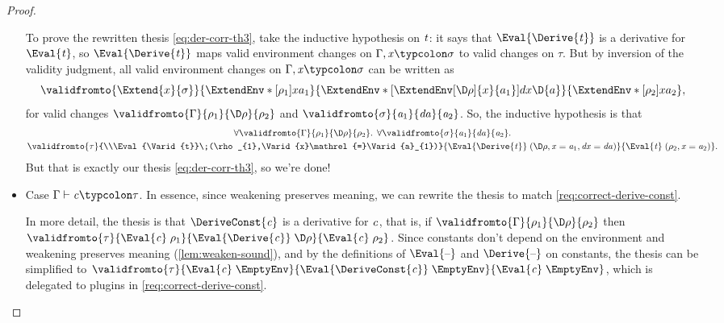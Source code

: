 \begin{proof}
\begin{itemize}
    To prove the rewritten thesis \cref{eq:der-corr-th3}, take the inductive hypothesis on \ensuremath{\Varid{t}}: it says
    that \ensuremath{\Eval{\Derive{\Varid{t}}}} is a derivative for \ensuremath{\Eval{\Varid{t}}}, so \ensuremath{\Eval{\Derive{\Varid{t}}}} maps
    valid environment changes on \ensuremath{\Gamma,\Varid{x}\typcolon\sigma} to valid changes on \ensuremath{\tau}.
    But by inversion of the validity judgment,
    all valid environment changes on \ensuremath{\Gamma,\Varid{x}\typcolon\sigma} can be written as
    \[
      \validfromto{\Extend{x}{\sigma}}
      {\ExtendEnv*[\rho_1]{x}{a_1}}
      {\ExtendEnv*[\ExtendEnv[\D\rho]{x}{a_1}]{dx}{\D{a}}}
      {\ExtendEnv*[\rho_2]{x}{a_2}},\]
    for valid changes \ensuremath{\validfromto{\Gamma}{\rho_{1}}{\D\rho}{\rho_{2}}} and \ensuremath{\validfromto{\sigma}{\Varid{a}_{1}}{\Varid{da}}{\Varid{a}_{2}}}.
    So, the inductive hypothesis is that
    \begin{multline}
      \ensuremath{\forall \validfromto{\Gamma}{\rho_{1}}{\D\rho}{\rho_{2}}\hsforall \hsdot{\circ }{\mathpunct{.}}\;\forall \validfromto{\sigma}{\Varid{a}_{1}}{\Varid{da}}{\Varid{a}_{2}}\hsforall \hsdot{\circ }{\mathpunct{.}}\\\validfromto{\tau}{\\\Eval{\Varid{t}}\;(\rho_{1},\Varid{x}\mathrel{=}\Varid{a}_{1})}{\Eval{\Derive{\Varid{t}}}\;(\D\rho,\Varid{x}\mathrel{=}\Varid{a}_{1},\Varid{dx}\mathrel{=}\Varid{da})}{\Eval{\Varid{t}}\;(\rho_{2},\Varid{x}\mathrel{=}\Varid{a}_{2})}}.
    \end{multline}
    But that is exactly our thesis \cref{eq:der-corr-th3}, so we're done!
  \item Case \ensuremath{\Gamma\vdash\Varid{c}\typcolon\tau}. In essence, since weakening
    preserves meaning, we can rewrite the thesis to match
    \cref{req:correct-derive-const}.

    In more detail, the thesis is that \ensuremath{\DeriveConst{\Varid{c}}} is a
    derivative for \ensuremath{\Varid{c}}, that is, if \ensuremath{\validfromto{\Gamma}{\rho_{1}}{\D\rho}{\rho_{2}}} then \ensuremath{\validfromto{\tau}{\Eval{\Varid{c}}\;\rho_{1}}{\Eval{\Derive{\Varid{c}}}\;\D\rho}{\Eval{\Varid{c}}\;\rho_{2}}}. Since constants don't depend on the
    environment and weakening preserves meaning
    (\cref{lem:weaken-sound}), and by the definitions of
    \ensuremath{\Eval{\text{\textendash}}} and \ensuremath{\Derive{\text{\textendash}}} on constants, the thesis
    can be simplified to \ensuremath{\validfromto{\tau}{\Eval{\Varid{c}}\;\EmptyEnv}{\Eval{\DeriveConst{\Varid{c}}}\;\EmptyEnv}{\Eval{\Varid{c}}\;\EmptyEnv}}, which is
    delegated to plugins in \cref{req:correct-derive-const}.
  \end{itemize}
\end{proof}

